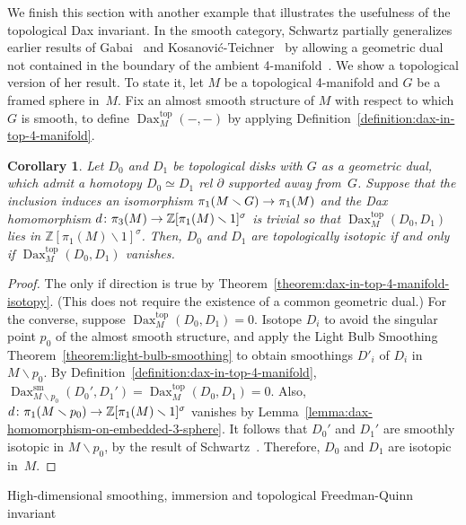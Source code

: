 \documentclass[11pt]{amsart}
\makeatletter
\def\section{\@startsection{section}{1}%
  \z@{-1.4\linespacing\@plus-.5\linespacing}{.8\linespacing}%
  {\normalfont\bfseries\Large\raggedright}}
\def\to{\mathchoice{\longrightarrow}{\rightarrow}{\rightarrow}{\rightarrow}}
\newtheorem{corollary}[theorem]{Corollary}
\theoremstyle{definition}
\theoremstyle{theorem-giventitle}
\theoremstyle{definition-giventitle}
\numberwithin{equation}{section}
\def\Z{\mathbb{Z}}
\def\sm{\mathrm{sm}}
\def\top{\mathrm{top}}
\def\Dax{\operatorname{Dax}}
\def\setminus{\smallsetminus}
\makeatother
\begin{document}
We finish this section with another example that illustrates the usefulness of the topological Dax invariant.
In the smooth category, Schwartz partially generalizes earlier results of Gabai~\cite{Gabai:2021-1} and Kosanovi\'{c}-Teichner~\cite{Kosanovic-Teichner:2024-1} by allowing a geometric dual not contained in the boundary of the ambient 4-manifold~\cite{Schwartz:2021-1}.
We show a topological version of her result.
To state it, let $M$ be a topological 4-manifold and $G$ be a framed sphere in~$M$.
Fix an almost smooth structure of $M$ with respect to which $G$ is smooth, to define $\Dax^\top_M(-,-)$ by applying Definition~\ref{definition:dax-in-top-4-manifold}.

\begin{corollary}
  \label{corollary:schwartz-top}
  Let $D_0$ and $D_1$ be topological disks with $G$ as a geometric dual, which admit a homotopy $D_0\simeq D_1$ rel $\partial$ supported away from~$G$.
  Suppose that the inclusion induces an isomorphism $\pi_1(M\setminus G) \to \pi_1(M)$ and the Dax homomorphism $d\colon \pi_3(M)\to \Z[\pi_1(M)\setminus 1]^\sigma$ is trivial so that $\Dax^\top_M(D_0,D_1)$ lies in $\Z[\pi_1(M)\setminus 1]^\sigma$.
  Then, $D_0$ and $D_1$ are topologically isotopic if and only if $\Dax^\top_M(D_0,D_1)$ vanishes.
\end{corollary}

\begin{proof}
  The only if direction is true by Theorem~\ref{theorem:dax-in-top-4-manifold-isotopy}.
  (This does not require the existence of a common geometric dual.)
  For the converse, suppose $\Dax^\top_M(D_0,D_1) = 0$. 
  Isotope $D_i$ to avoid the singular point $p_0$ of the almost smooth structure, and apply the Light Bulb Smoothing Theorem~\ref{theorem:light-bulb-smoothing} to obtain smoothings $D'_i$ of $D_i$ in $M\setminus p_0$.
  By Definition~\ref{definition:dax-in-top-4-manifold}, $\Dax^\sm_{M\setminus p_0}(D_0',D_1') = \Dax^\top_M(D_0,D_1) = 0$.
  Also, $d\colon \pi_1(M\setminus p_0) \to \Z[\pi_1(M) \setminus 1]^\sigma$ vanishes by Lemma~\ref{lemma:dax-homomorphism-on-embedded-3-sphere}.
  It follows that $D_0'$ and $D_1'$ are smoothly isotopic in $M\setminus p_0$, by the result of Schwartz~\cite{Schwartz:2021-1}.
  Therefore, $D_0$ and $D_1$ are isotopic in~$M$.
\end{proof}






\appendix
\def\sectionname{}\let\temp=\thesection\def\thesection{Appendix}
\section{High-dimensional smoothing, immersion and topological Freedman-Quinn invariant}
\label{section:smoothing-immersion-top-fq}
\let\thesection=\temp
\end{document}
